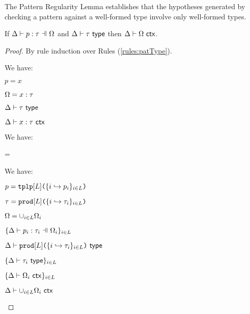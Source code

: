 {{{{The Pattern Regularity Lemma establishes that the hypotheses generated by checking a pattern against a well-formed type involve only well-formed types.
\begin{lemma}\label{lemma:pattern-regularity-UP} 
If $\patType{\pctx}{p}{\tau}$ and $\Delta \vdash \tau~\mathsf{type}$ then $\Delta \vdash \Omega~\mathsf{ctx}$.
\end{lemma}
\begin{proof} By rule induction over Rules (\ref{rules:patType}).
\begin{byCases}
\item[\text{(\ref{rule:patType-var})}] We have:
\begin{pfsteps*}
  \item $p=x$ 
  \item $\Omega=x : \tau$ 
  \item $\Delta \vdash \tau~\mathsf{type}$ 
  \item $\Delta \vdash x : \tau~\mathsf{ctx}$ 
 \end{pfsteps*}
 \resetpfcounter
\item[\text{(\ref{rule:patType-wild})}] We have:
\begin{pfsteps}
\item \pctx=\emptyset {}
\item \isctxU{\Delta}{\emptyset} 
\end{pfsteps}
\resetpfcounter

\item[\text{(\ref{rule:patType-tpl})}] We have:
\begin{pfsteps*}
  \item $p=\texttt{tplp}[L]\texttt{(}\{i \hookrightarrow p_{i}\}_{i \in L}\texttt{)}$ 
  \item $\tau=\texttt{prod}[L]\texttt{(}\{i \hookrightarrow \tau_{i}\}_{i \in L}\texttt{)}$ 
  \item $\Omega=\cup_{i \in L} \Omega_i$ 
  \item $\{\patType{\pctx_i}{p_i}{\tau_i}\}_{i \in \labelset}$ 
  \item $\Delta \vdash \texttt{prod}[L]\texttt{(}\{i \hookrightarrow \tau_{i}\}_{i \in L}\texttt{)}~\mathsf{type}$  
  \item $\{\Delta \vdash \tau_i~\mathsf{type}\}_{i \in L}$ 
  \item $\{\Delta \vdash \Omega_i~\mathsf{ctx}\}_{i \in L}$  
  \item $\Delta \vdash \cup_{i \in L} \Omega_i~\mathsf{ctx}$ 
\end{pfsteps*}
\resetpfcounter


\end{byCases}
\end{proof}}}}}
